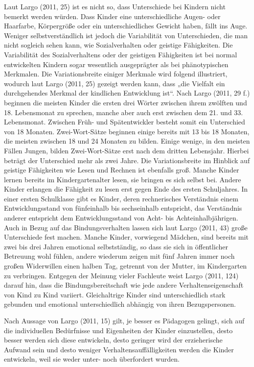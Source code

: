 Laut Largo (2011, 25) ist es nicht so, dass Unterschiede bei Kindern nicht bemerkt werden würden. Dass Kinder eine unterschiedliche Augen- oder Haarfarbe, Körpergröße oder ein unterschiedliches Gewicht haben, fällt ins Auge. Weniger selbstverständlich ist jedoch die Variabilität von Unterschieden, die man nicht sogleich sehen kann, wie Sozialverhalten oder geistige Fähigkeiten. Die Variabilität des Sozialverhaltens oder der geistigen Fähigkeiten ist bei normal entwickelten Kindern sogar wesentlich ausgeprägter als bei phänotypischen Merkmalen. Die Variationsbreite einiger Merkmale wird folgend illustriert, wodurch laut Largo (2011, 25) gezeigt werden kann, dass „die Vielfalt ein durchgehendes Merkmal der kindlichen Entwicklung ist“. Nach Largo (2011, 29 f.) beginnen die meisten Kinder die ersten drei Wörter zwischen ihrem zwölften und 18. Lebensmonat zu sprechen, manche aber auch erst zwischen dem 21. und 33. Lebensmonat. Zwischen Früh- und Spätentwickler besteht somit ein Unterschied von 18 Monaten. Zwei-Wort-Sätze beginnen einige bereits mit 13 bis 18 Monaten, die meisten zwischen 18 und 24 Monaten zu bilden. Einige wenige, in den meisten Fällen Jungen, bilden Zwei-Wort-Sätze erst nach dem dritten Lebensjahr. Hierbei beträgt der Unterschied mehr als zwei Jahre. Die Variationsbreite im Hinblick auf geistige Fähigkeiten wie Lesen und Rechnen ist ebenfalls groß. Manche Kinder lernen bereits im Kindergartenalter lesen, sie bringen es sich selbst bei. Andere Kinder erlangen die Fähigkeit zu lesen erst gegen Ende des ersten Schuljahres. In einer ersten Schulklasse gibt es Kinder, deren rechnerisches Verständnis einem Entwicklungsstand von fünfeinhalb bis sechseinhalb entspricht, das Verständnis anderer entspricht dem Entwicklungsstand von Acht- bis Achteinhalbjährigen. Auch in Bezug auf das Bindungsverhalten lassen sich laut Largo (2011, 43) große Unterschiede fest machen. Manche Kinder, vorwiegend Mädchen, sind bereits mit zwei bis drei Jahren emotional selbstständig, so dass sie sich in öffentlicher Betreuung wohl fühlen, andere wiederum zeigen mit fünf Jahren immer noch großen Widerwillen einen halben Tag, getrennt von der Mutter, im Kindergarten zu verbringen. Entgegen der Meinung vieler Fachleute weist Largo (2011, 124) darauf hin, dass die Bindungsbereitschaft wie jede andere Verhaltenseigenschaft von Kind zu Kind variiert. Gleichaltrige Kinder sind unterschiedlich stark gebunden und emotional unterschiedlich abhängig von ihren Bezugspersonen. 

Nach Aussage von Largo (2011, 15) gilt, je besser es Pädagogen gelingt, sich auf die individuellen Bedürfnisse und Eigenheiten der Kinder einzustellen, desto besser werden sich diese entwickeln, desto geringer wird der erzieherische Aufwand sein und desto weniger Verhaltensauffälligkeiten werden die Kinder entwickeln, weil sie weder unter- noch überfordert wurden.   

